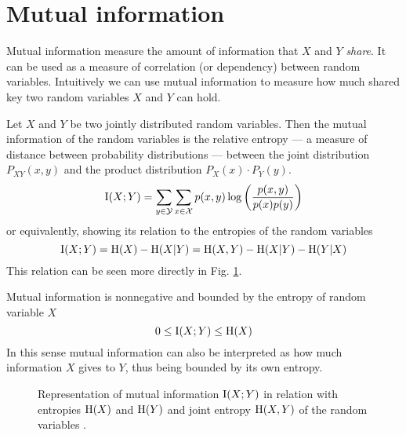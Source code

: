 \label{ch:four}
\section{Mutual information}\label{mutInfo}
	Mutual information measure the amount of information that $X$ and $Y$ \textit{share}.
    It can be used as a measure of correlation (or dependency) between random variables.
    Intuitively we can use mutual information to measure how much shared key two random variables $X$ and $Y$ can hold.
    \begin{definition}
	Let $X$ and $Y$ be two jointly distributed random variables. Then the mutual information of the random variables is the relative entropy --- a measure of distance between probability distributions --- between the joint distribution $P_{XY}(x,y)$ and the product distribution $P_X(x)\cdot P_Y(y)$.
	\begin{equation}
		\operatorname{I}(X;Y) = \sum_{y\in\mathcal{Y}}\sum_{x\in\mathcal{X}} p(x,y) \log\left(\frac{p(x,y)}{p(x)p(y)}\right) 
	\end{equation}
	or equivalently, showing its relation to the entropies of the random variables
	\begin{equation}
		\operatorname{I}(X;Y) = \operatorname{H}(X) - \operatorname{H}(X|Y) = \operatorname{H}(X,Y) - \operatorname{H}(X|Y) - \operatorname{H}(Y|X)
	\end{equation}
	This relation can be seen more directly in Fig. \ref{fig:mutual_info}.
    \end{definition} 
	Mutual information is nonnegative and bounded by the entropy of random variable $X$
	\begin{equation}
		0 \leq \operatorname{I}(X;Y) \leq \operatorname{H}(X)
	\end{equation}
	In this sense mutual information can also be interpreted as how much information $X$ gives to $Y$, thus being bounded by its own entropy.
	\begin{figure}[ht]
		\centering
		
		\caption{Representation of mutual information $\operatorname{I}(X;Y)$ in relation with entropies $\operatorname{H}(X)$ and $\operatorname{H}(Y)$ and joint entropy $\operatorname{H}(X,Y)$ of the random variables .
		\label{fig:mutual_info}}
	\end{figure}	
	
